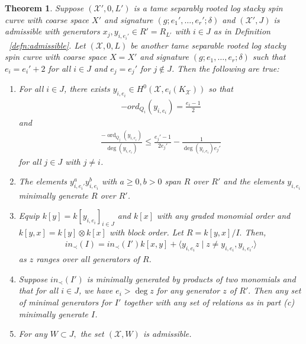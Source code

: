 \documentclass{amsart}
\theoremstyle{plain}
\newtheorem{thm}{Theorem}[section]
\theoremstyle{definition}
\theoremstyle{remark}
\numberwithin{equation}{section}
\newcommand \sx{\mathscr X}
\DeclareMathOperator{\ord}{ord}
\newcommand \subhalf[1]{\frac{{#1} - 1}{2{#1}}}
\newcommand \halfcan{L}
\begin{document}
\begin{thm}
\label{thm:ram_order_ind}
Suppose $(\sx', 0, \halfcan')$ is a tame separably rooted log
stacky spin curve with coarse space $X'$ and signature
$(g; e_1', \ldots, e_r'; \delta)$ and $(\sx', J)$ is
admissible with generators $x_j, y_{i,e_i'} \in R' = R_{L'}$ with
$i \in J$ as in Definition ~\ref{defn:admissible}. Let $(\sx, 0,
\halfcan)$ be another tame separable rooted log stacky spin curve
with coarse space $X = X'$ and signature $(g; e_1, \ldots, e_r;
\delta)$ such that $e_i = e_i' + 2$ for all $i \in J$ and
$e_j = e_j'$ for $j \notin J$. Then the following are true:
\begin{enumerate}
	\item[(a)] For all $i \in J$, there exists $y_{i,e_i} \in
		H^0(\sx, e_i(K_\sx))$ so that
		\begin{align*}
			-ord_{Q_i}(y_{i,e_i}) = \frac{e_i-1}{2}
		\end{align*}
		and
		\begin{align*}
			\frac{-\ord_{Q_j}(y_{i, e_i})}{\deg (y_{i, e_i})} \leq \subhalf{
			e_j'} - \frac{1}{\deg(y_{i,e_i})e_j'}
		\end{align*}
		for all $j \in J$ with $j \neq i$.
	\item[(b)] The elements $y_{i,e_i'}^ay_{i,e_i}^b$ with $a \geq 0,
		b > 0$ span $R$ over $R'$ and the elements $y_{i,e_i}$ minimally
		generate $R$ over $R'$.
	\item[(c)] Equip $k[y] = k[y_{i,e_i}]_{i \in J}$ and $k[x]$ with
		any graded monomial order and $k[y,x] = k[y] \otimes k[x]$ with
		block order. Let $R = k[y,x]/I.$ Then,
		\begin{align*}
			in_\prec(I) = in_\prec(I')k[x,y] + \langle y_{i,e_i}z \mid z 
			\neq y_{i,e_i},y_{i,e_i'} \rangle
		\end{align*}
		as $z$ ranges over all generators of $R$.
	\item[(d)] Suppose $in_\prec(I')$ is minimally generated by
		products of two monomials and that for all $i \in J$, we have $e
		_i > \deg z$ for any generator $z$ of $R'.$ Then any set of
		minimal generators for $I'$ together with any set of relations 
as in 
		part (c) minimally generate $I$.
	\item[(e)] For any $W \subset J,$ the set $(\sx,W)$ is admissible.
\end{enumerate}
\end{thm}
\end{document}
